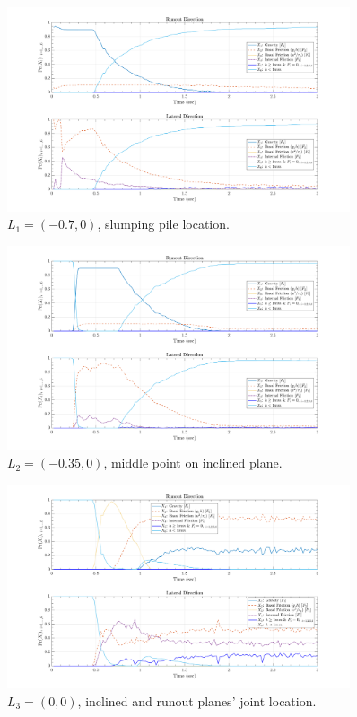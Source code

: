 \documentclass{article}
\begin{document}
\begin{figure}[H]
\centering
	\includegraphics[width=0.9\textwidth]{InclinedPlane/LocalRecords/DominancePr_x1C.png}
	\caption{$L_1=(-0.7,0)$, slumping pile location.}
	\label{fig:Ramp-Prx1C}
\end{figure}

\begin{figure}[H]
\centering
	\includegraphics[width=0.9\textwidth]{InclinedPlane/LocalRecords/DominancePr_x2C.png}
	\caption{$L_2=(-0.35,0)$, middle point on inclined plane.}
	\label{fig:Ramp-Prx2C}
\end{figure}

\begin{figure}[H]
\centering
	\includegraphics[width=0.9\textwidth]{InclinedPlane/LocalRecords/DominancePr_x3C.png}
	\caption{$L_3=(0,0)$, inclined and runout planes' joint location.}
	\label{fig:Ramp-Prx3C}
\end{figure}
\end{document}
